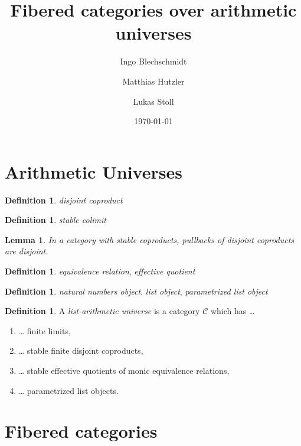\documentclass[a4paper]{amsart}
\author{Ingo Blechschmidt}
\author{Matthias Hutzler}
\author{Lukas Stoll}
\title{Fibered categories over arithmetic universes}
\date{\today}
\theoremstyle{plain}
\newtheorem{lemma}[theorem]{Lemma}
\theoremstyle{definition}
\newtheorem{definition}[theorem]{Definition}
\begin{document}
\maketitle

\section{Arithmetic Universes}

\begin{definition}
  \emph{disjoint coproduct}
\end{definition}

\begin{definition}
  \emph{stable colimit}
\end{definition}

\begin{lemma}
  In a category with stable coproducts, pullbacks of disjoint coproducts are disjoint.
\end{lemma}

\begin{definition}
  \emph{equivalence relation},
  \emph{effective quotient}
\end{definition}

\begin{definition}
  \emph{natural numbers object},
  \emph{list object},
  \emph{parametrized list object}
\end{definition}

\begin{definition}
  A \emph{list-arithmetic universe} is a category $𝒞$ which has …
  \begin{enumerate}
    \item … finite limits,
    \item … stable finite disjoint coproducts,
    \item … stable effective quotients of monic equivalence relations,
    \item … parametrized list objects.
  \end{enumerate}
\end{definition}

\section{Fibered categories}
\end{document}
